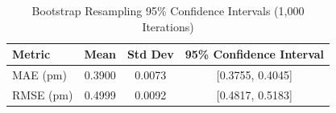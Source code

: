 \begin{table}[h]
\centering
\caption{Bootstrap Resampling 95\% Confidence Intervals (1,000 Iterations)}
\label{tab:bootstrap_stats}
\begin{tabular}{lccc}
\hline
\textbf{Metric} & \textbf{Mean} & \textbf{Std Dev} & \textbf{95\% Confidence Interval} \\ \hline
MAE (pm) & 0.3900 & 0.0073 & [0.3755, 0.4045] \\
RMSE (pm) & 0.4999 & 0.0092 & [0.4817, 0.5183] \\ \hline
\end{tabular}
\end{table}